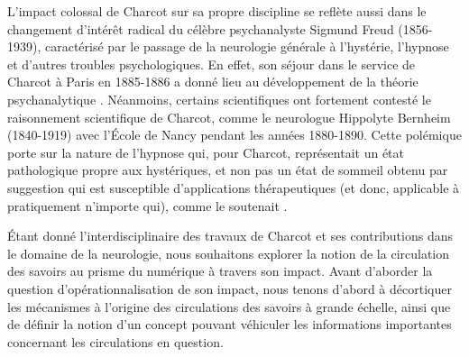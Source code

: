 L'impact colossal de Charcot sur sa propre discipline se reflète aussi dans le changement  d'intérêt radical du célèbre psychanalyste Sigmund Freud (1856-1939), caractérisé par le passage de la neurologie générale à l'hystérie, l'hypnose et d'autres troubles psychologiques. En effet, son séjour dans le service de Charcot à Paris en 1885-1886 a donné lieu au développement de la théorie psychanalytique \citep{camargo2018jean}. Néanmoins, certains scientifiques ont fortement contesté le raisonnement scientifique de Charcot, comme le neurologue Hippolyte Bernheim (1840-1919) avec l'École de Nancy pendant les années 1880-1890. Cette polémique porte sur la nature de l'hypnose qui, pour Charcot, représentait un état pathologique propre aux hystériques, et non pas un état de sommeil obtenu par suggestion qui est susceptible d'applications
thérapeutiques (et donc, applicable à pratiquement n'importe qui), comme le soutenait \cite{bernheim1891suggestion}. 

Étant donné l'interdisciplinaire des travaux de Charcot et ses contributions dans le domaine  de la neurologie, nous souhaitons explorer la notion de la circulation des savoirs au prisme du numérique à travers son impact. Avant d'aborder la question d'opérationnalisation de son impact, nous tenons d'abord à décortiquer les mécanismes à l'origine des circulations des savoirs à grande échelle, ainsi que de définir la notion d'un \og{}concept\fg{} pouvant véhiculer les informations importantes concernant les circulations en question.  










